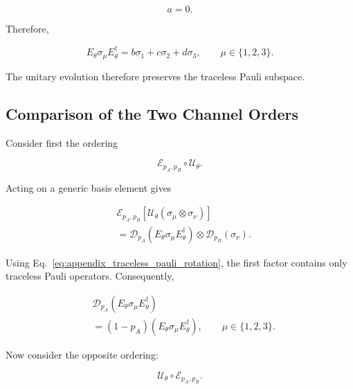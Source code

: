 \[
a=0.
\]

Therefore,

\begin{equation}
E_{\theta}\sigma_{\mu}E_{\theta}^{\dagger}
=
b\sigma_1
+
c\sigma_2
+
d\sigma_3,
\qquad
\mu\in\{1,2,3\}.
\label{eq:appendix_traceless_pauli_rotation}
\end{equation}

\medskip

The unitary evolution therefore preserves the traceless Pauli subspace.


\subsection*{Comparison of the Two Channel Orders}

Consider first the ordering

\begin{equation}
\mathcal{E}_{p_A,p_B}
\circ
\mathcal{U}_{\theta}.
\end{equation}

Acting on a generic basis element gives

\begin{align}
&
\mathcal{E}_{p_A,p_B}
\left[
\mathcal{U}_{\theta}
\left(
\sigma_{\mu}\otimes\sigma_{\nu}
\right)
\right]
\nonumber
\\
&=
\mathcal{D}_{p_A}
\left(
E_{\theta}\sigma_{\mu}E_{\theta}^{\dagger}
\right)
\otimes
\mathcal{D}_{p_B}
\left(
\sigma_{\nu}
\right).
\label{eq:appendix_left_order}
\end{align}

Using Eq.~\eqref{eq:appendix_traceless_pauli_rotation}, the first factor contains only traceless Pauli operators. Consequently,

\begin{align}
&
\mathcal{D}_{p_A}
\left(
E_{\theta}\sigma_{\mu}E_{\theta}^{\dagger}
\right)
\nonumber
\\
&=
(1-p_A)
\left(
E_{\theta}\sigma_{\mu}E_{\theta}^{\dagger}
\right),
\qquad
\mu\in\{1,2,3\}.
\label{eq:appendix_left_scaling}
\end{align}

\medskip

Now consider the opposite ordering:

\begin{equation}
\mathcal{U}_{\theta}
\circ
\mathcal{E}_{p_A,p_B}.
\end{equation}


